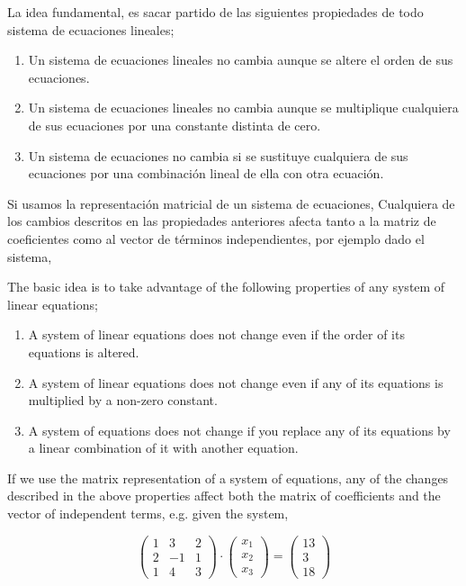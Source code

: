 \begin{paracol}{2}
La idea fundamental, es sacar partido de las siguientes propiedades de todo sistema de ecuaciones lineales;
\begin{enumerate}
\item Un sistema de ecuaciones lineales no cambia aunque se altere el orden de sus ecuaciones.
\item Un sistema de ecuaciones lineales no cambia aunque se multiplique cualquiera de sus ecuaciones por una constante distinta de cero.
\item Un sistema de ecuaciones no cambia si se sustituye cualquiera de sus ecuaciones por una combinación lineal de ella con otra ecuación.
\end{enumerate}
 
Si usamos la representación matricial de un sistema de ecuaciones, Cualquiera de los cambios descritos en las propiedades anteriores afecta tanto a la matriz de coeficientes como al vector de términos independientes, por ejemplo dado el sistema,

\switchcolumn

The basic idea is to take advantage of the following properties of any system of linear equations;
\begin{enumerate}
\item A system of linear equations does not change even if the order of its equations is altered.
\item A system of linear equations does not change even if any of its equations is multiplied by a non-zero constant.
\item A system of equations does not change if you replace any of its equations by a linear combination of it with another equation.
\end{enumerate}
 
If we use the matrix representation of a system of equations, any of the changes described in the above properties affect both the matrix of coefficients and the vector of independent terms, e.g. given the system,
\end{paracol}

 
\begin{equation*}
\begin{pmatrix}
1& 3& 2\\
2& -1& 1\\
1& 4& 3
\end{pmatrix}\cdot \begin{pmatrix}
x_1\\
x_2\\
x_3
\end{pmatrix}=\begin{pmatrix}
13\\
3\\
18
\end{pmatrix}
\end{equation*}

